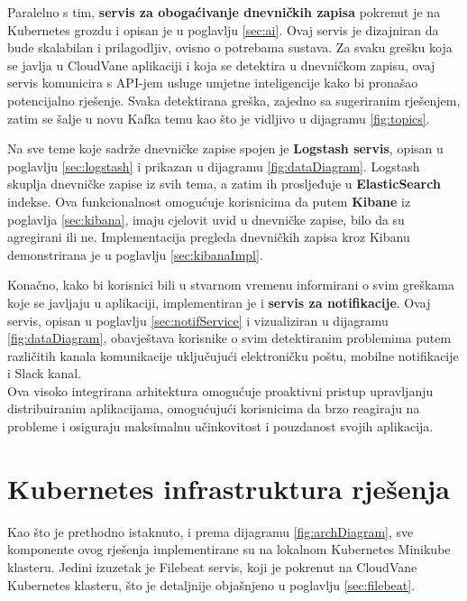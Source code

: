 \documentclass[times, utf8, diplomski]{fer}
\begin{document}
Paralelno s tim, \textbf{servis za obogaćivanje dnevničkih zapisa} pokrenut je na Kubernetes grozdu i opisan je u poglavlju \ref{sec:ai}. Ovaj servis je dizajniran da bude skalabilan i prilagodljiv, ovisno o potrebama sustava. Za svaku grešku koja se javlja u CloudVane aplikaciji i koja se detektira u dnevničkom zapisu, ovaj servis komunicira s API-jem usluge umjetne inteligencije kako bi pronašao potencijalno rješenje. Svaka detektirana greška, zajedno sa sugeriranim rješenjem, zatim se šalje u novu Kafka temu kao što je vidljivo u dijagramu \ref{fig:topics}.

Na sve teme koje sadrže dnevničke zapise spojen je \textbf{Logstash servis}, opisan u poglavlju \ref{sec:logstash} i prikazan u dijagramu \ref{fig:dataDiagram}. Logstash skuplja dnevničke zapise iz svih tema, a zatim ih prosljeđuje u \textbf{ElasticSearch} indekse. Ova funkcionalnost omogućuje korisnicima da putem \textbf{Kibane} iz poglavlja \ref{sec:kibana}, imaju cjelovit uvid u dnevničke zapise, bilo da su agregirani ili ne. Implementacija pregleda dnevničkih zapisa kroz Kibanu demonstrirana je u poglavlju \ref{sec:kibanaImpl}.

Konačno, kako bi korisnici bili u stvarnom vremenu informirani o svim greškama koje se javljaju u aplikaciji, implementiran je i \textbf{servis za notifikacije}. Ovaj servis, opisan u poglavlju \ref{sec:notifService} i vizualiziran u dijagramu \ref{fig:dataDiagram}, obavještava korisnike o svim detektiranim problemima putem različitih kanala komunikacije uključujući elektroničku poštu, mobilne notifikacije i Slack kanal.\\

Ova visoko integrirana arhitektura omogućuje proaktivni pristup upravljanju distribuiranim aplikacijama, omogućujući korisnicima da brzo reagiraju na probleme i osiguraju maksimalnu učinkovitost i pouzdanost svojih aplikacija.


\section{Kubernetes infrastruktura rješenja}
\label{sec:localKubernetes}

Kao što je prethodno istaknuto, i prema dijagramu \ref{fig:archDiagram}, sve komponente ovog rješenja implementirane su na lokalnom Kubernetes Minikube klasteru. Jedini izuzetak je Filebeat servis, koji je pokrenut na CloudVane Kubernetes klasteru, što je detaljnije objašnjeno u poglavlju \ref{sec:filebeat}.\\
\end{document}

